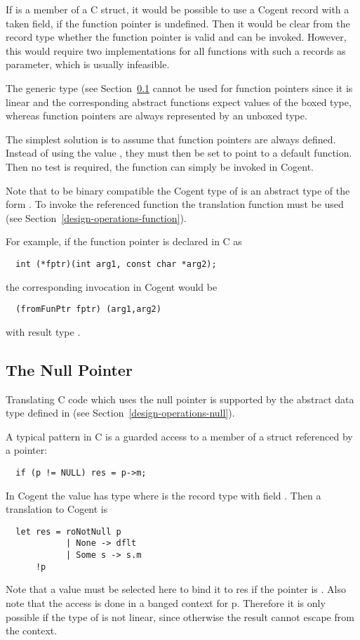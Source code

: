 If  is a member of a C struct, it would be possible to use a Cogent record with a taken field,
if the function pointer is undefined. Then it would be clear from the record type whether the function pointer
is valid and can be invoked. However, this would require two implementations for all functions with such a records 
as parameter, which is usually infeasible.

The generic type  (see Section~\ref{app-transfunction-null} cannot be used for function pointers since
it is linear and the corresponding abstract functions expect values of the boxed type, whereas function pointers
are always represented by an unboxed type.

The simplest solution is to assume that function pointers are always defined. Instead of using the value 
, they must then be set to point to a default function. Then no test is required, the function
can simply be invoked in Cogent.

Note that to be binary compatible the Cogent type of  is an abstract type of the form .
To invoke the referenced function the translation function  must be used (see 
Section~\ref{design-operations-function}). 

For example, if the function pointer is declared in C as 
\begin{verbatim}
  int (*fptr)(int arg1, const char *arg2);
\end{verbatim}
the corresponding invocation in Cogent would be
\begin{verbatim}
  (fromFunPtr fptr) (arg1,arg2)
\end{verbatim}
with result type .

\subsection{The Null Pointer}
\label{app-transfunction-null}

Translating C code which uses the null pointer is supported by the abstract data type  defined
in  (see Section~\ref{design-operations-null}).

A typical pattern in C is a guarded access to a member of a struct referenced by a pointer:
\begin{verbatim}
  if (p != NULL) res = p->m;
\end{verbatim}
In Cogent the value  has type  where  is the record type with field . 
Then a translation to Cogent is
\begin{verbatim}
  let res = roNotNull p 
            | None -> dflt
            | Some s -> s.m
      !p
\end{verbatim}
Note that a value  must be selected here to bind it to res if the pointer is . Also note that the access is
done in a banged context for p. Therefore it is only possible if the type of  is not linear, since otherwise the result
cannot escape from the context.

